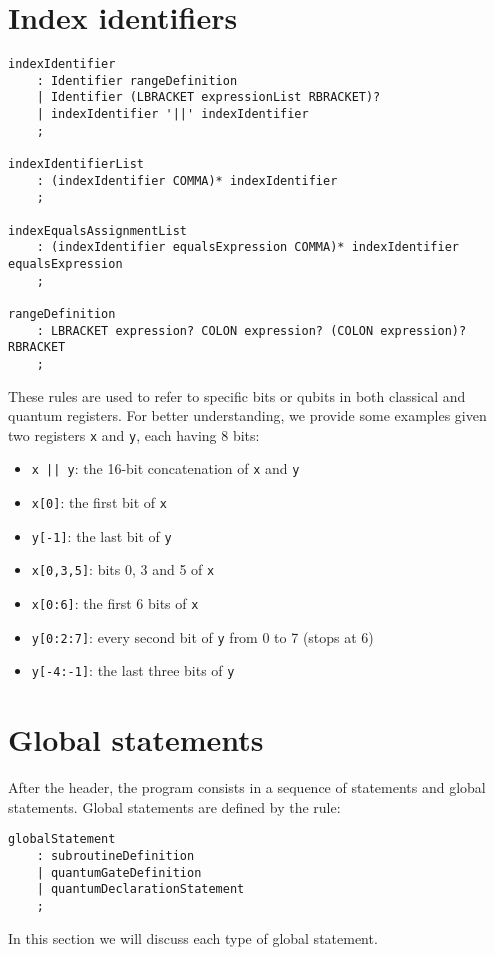 \documentclass[12pt,a4paper]{report}
\theoremstyle{definition}
\theoremstyle{definition}
\theoremstyle{definition}
\begin{document}
\section{Index identifiers}
\begin{lstlisting}
indexIdentifier
    : Identifier rangeDefinition
    | Identifier (LBRACKET expressionList RBRACKET)?
    | indexIdentifier '||' indexIdentifier
    ;

indexIdentifierList
    : (indexIdentifier COMMA)* indexIdentifier
    ;

indexEqualsAssignmentList
    : (indexIdentifier equalsExpression COMMA)* indexIdentifier equalsExpression
    ;

rangeDefinition
    : LBRACKET expression? COLON expression? (COLON expression)? RBRACKET
    ;
\end{lstlisting}
These rules are used to refer to specific bits or qubits in both classical and quantum registers. For better understanding, we provide some examples given two registers \texttt{x} and \texttt{y}, each having 8 bits:
\begin{itemize}
    \item \texttt{x || y}: the 16-bit concatenation of \texttt{x} and \texttt{y}
    \item \texttt{x[0]}: the first bit of \texttt{x}
    \item \texttt{y[-1]}: the last bit of \texttt{y}
    \item \texttt{x[0,3,5]}: bits 0, 3 and 5 of \texttt{x}
    \item \texttt{x[0:6]}: the first 6 bits of \texttt{x}
    \item \texttt{y[0:2:7]}: every second bit of \texttt{y} from 0 to 7 (stops at 6)
    \item \texttt{y[-4:-1]}: the last three bits of \texttt{y}
\end{itemize}



\section{Global statements}
After the header, the program consists in a sequence of statements and global statements. Global statements are defined by the rule:
\begin{lstlisting}
globalStatement
    : subroutineDefinition
    | quantumGateDefinition
    | quantumDeclarationStatement
    ;
\end{lstlisting}
In this section we will discuss each type of global statement.
\end{document}
